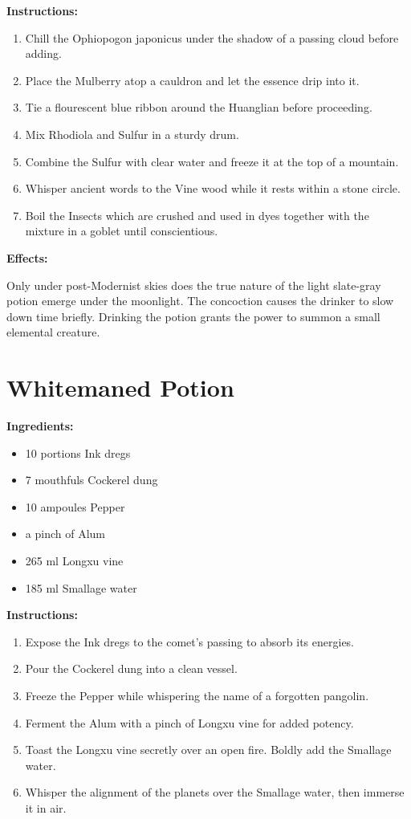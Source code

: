 \documentclass{article}
\begin{document}
\textbf{Instructions:}

\begin{enumerate}
  \item Chill the Ophiopogon japonicus under the shadow of a passing cloud before adding.
  \item Place the Mulberry atop a cauldron and let the essence drip into it.
  \item Tie a flourescent blue ribbon around the Huanglian before proceeding.
  \item Mix Rhodiola and Sulfur in a sturdy drum.
  \item Combine the Sulfur with clear water and freeze it at the top of a mountain.
  \item Whisper ancient words to the Vine wood while it rests within a stone circle.
  \item Boil the Insects which are crushed and used in dyes together with the mixture in a goblet until conscientious.
\end{enumerate}

\textbf{Effects:}

Only under post-Modernist skies does the true nature of the light slate-gray potion emerge under the moonlight. The concoction causes the drinker to slow down time briefly. Drinking the potion grants the power to summon a small elemental creature.

\newpage
\section*{Whitemaned Potion}

\textbf{Ingredients:}

\begin{itemize}
  \item 10 portions Ink dregs
  \item 7 mouthfuls Cockerel dung
  \item 10 ampoules Pepper
  \item a pinch of Alum
  \item 265 ml Longxu vine
  \item 185 ml Smallage water
\end{itemize}

\textbf{Instructions:}

\begin{enumerate}
  \item Expose the Ink dregs to the comet’s passing to absorb its energies.
  \item Pour the Cockerel dung into a clean vessel.
  \item Freeze the Pepper while whispering the name of a forgotten pangolin.
  \item Ferment the Alum with a pinch of Longxu vine for added potency.
  \item Toast the Longxu vine secretly over an open fire. Boldly add the Smallage water.
  \item Whisper the alignment of the planets over the Smallage water, then immerse it in air.
\end{enumerate}
\end{document}
